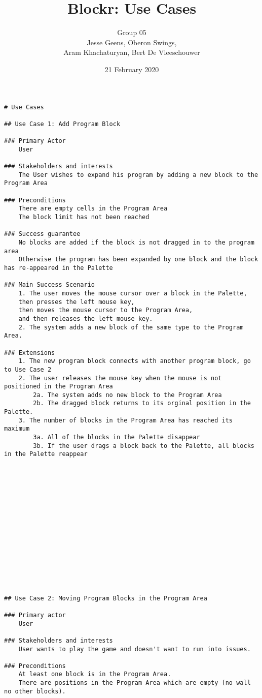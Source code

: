 \documentclass{article}
\title{\vspace{-50pt}Blockr: Use Cases}
\author{Group 05\\ Jesse Geens, Oberon Swings,\\ Aram Khachaturyan, Bert De Vleeschouwer}
\date{21 February 2020}
\begin{document}
\maketitle

\begin{verbatim}
# Use Cases

## Use Case 1: Add Program Block

### Primary Actor 
    User
    
### Stakeholders and interests
    The User wishes to expand his program by adding a new block to the Program Area
    
### Preconditions
    There are empty cells in the Program Area
    The block limit has not been reached
    
### Success guarantee
    No blocks are added if the block is not dragged in to the program area 
    Otherwise the program has been expanded by one block and the block has re-appeared in the Palette
    
### Main Success Scenario
    1. The user moves the mouse cursor over a block in the Palette, 
    then presses the left mouse key, 
    then moves the mouse cursor to the Program Area, 
    and then releases the left mouse key.
    2. The system adds a new block of the same type to the Program Area.
    
### Extensions
    1. The new program block connects with another program block, go to Use Case 2
    2. The user releases the mouse key when the mouse is not positioned in the Program Area
        2a. The system adds no new block to the Program Area
        2b. The dragged block returns to its orginal position in the Palette.
    3. The number of blocks in the Program Area has reached its maximum
        3a. All of the blocks in the Palette disappear
        3b. If the user drags a block back to the Palette, all blocks in the Palette reappear
















## Use Case 2: Moving Program Blocks in the Program Area

### Primary actor
    User
    
### Stakeholders and interests
    User wants to play the game and doesn't want to run into issues.

### Preconditions
    At least one block is in the Program Area.
    There are positions in the Program Area which are empty (no wall no other blocks).


\end{verbatim}
\end{document}
